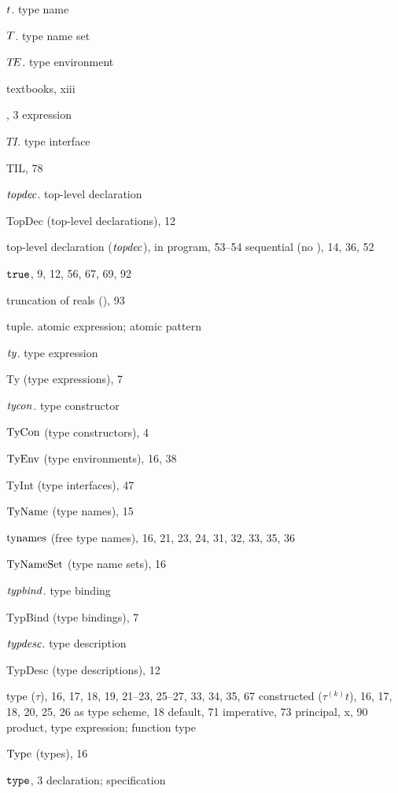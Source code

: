 \begin{theindex}
\item $t$. \see type name
\item $T$. \see type name set
\item $\mbox{$T\!E$}$. \see type environment
\item textbooks, xiii
\item \THEN, 3
\subitem \seealso expression
\item $T\!I$. \see type interface
\item TIL, 78
\item ${\it topdec}$. \see top-level declaration
\item TopDec (top-level declarations), 12
\item top-level declaration (${\it topdec}$),
\subitem in program, 53--54
\subitem sequential (no \boxml{;}), 14, 36, 52
\item $\mbox{\tt true}$, 9, 12, 56, 67,  69, 92
\item truncation of reals (), 93
\item tuple. \see atomic expression; atomic pattern
\item ${\it ty}$. \see type expression
\item Ty (type expressions), 7
\item ${\it tycon}$. \see type constructor
\item ${\rm TyCon}$ (type constructors), 4
\item ${\rm TyEnv}$ (type environments), 16, 38
\item TyInt (type interfaces), 47
\item ${\rm TyName}$ (type names), 15
\item $\mathop{\rm tynames}\nolimits$ (free type names), 16, 21, 23, 24, 31, 32, 33, 35, 36
\item ${\rm TyNameSet}$ (type name sets), 16
\item ${\it typbind}$. \see type binding
\item TypBind (type bindings), 7
\item ${\it typdesc}$. \see type description
\item TypDesc (type descriptions), 12
\item type ($\tau$), 16, 17, 18, 19, 21--23, 25--27, 33, 34, 35, 67
\subitem constructed ($\tau^{(k)}t$), 16, 17, 18, 20, 25, 26
\subitem as type scheme, 18
\subitem default, 71
\subitem imperative, 73
\subitem principal, x, 90
\subitem product, \startyperefs
\subitem \seealso type expression; function type
\item ${\rm Type}$ (types), 16
\item ${\tt type}$, 3
\subitem \seealso declaration; specification

\end{theindex}
